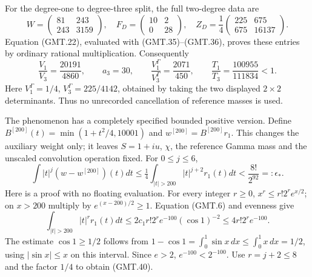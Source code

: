 For the degree-one to degree-three split, the full two-degree data are
\[
 W=\begin{pmatrix}81&243\\243&3159\end{pmatrix},\quad
 F_D=\begin{pmatrix}10&2\\0&28\end{pmatrix},\quad
 Z_D=\frac14\begin{pmatrix}225&675\\675&16137\end{pmatrix}.
                                                                    \tag{GMT.38}
\]
Equation (GMT.22), evaluated with (GMT.35)--(GMT.36), proves these
entries by ordinary rational multiplication. Consequently
\[
 \frac{V_1}{V_3}=\frac{20191}{4860},\qquad a_3=30,
 \qquad\frac{V_1^\Gamma}{V_3^\Gamma}=\frac{2071}{450},\qquad
 \boxed{\frac{T_1}{T_3}=\frac{100955}{111834}<1.}               \tag{GMT.39}
\]
Here $V_1^\Gamma=1/4$, $V_3^\Gamma=225/4142$, obtained by
taking the two displayed $2\times2$ determinants. Thus no
unrecorded cancellation of reference masses is used.

The phenomenon has a completely specified bounded positive version.
Define $B^{[200]}(t)=\min(1+t^2/4,10001)$ and
$w^{[200]}=B^{[200]}r_1$. This changes the auxiliary weight only;
it leaves $S=1+iu$, $\chi$, the reference Gamma mass and the
unscaled convolution operation fixed. For $0\le j\le6$,
\[
 \int |t|^j(w-w^{[200]})(t)dt
 \le\tfrac14\int_{|t|>200}|t|^{j+2}r_1(t)dt
 <\frac{8!}{2^{92}}=:\epsilon_*.                              \tag{GMT.40}
\]
Here is a proof with no floating evaluation. For every integer $r\ge0$,
$x^r\le r!2^r e^{x/2}$; on $x>200$ multiply by
$e^{(x-200)/2}\ge1$. Equation (GMT.6) and evenness give
\[
 \int_{|t|>200}|t|^r r_1(t)dt
 \le 2c_1 r!2^r e^{-100}(\cos1)^{-2}
 \le4r!2^r e^{-100}.
\]
The estimate $\cos1\ge1/2$ follows from
$1-\cos1=\int_0^1\sin x\,dx\le\int_0^1x\,dx=1/2$,
using $|\sin x|\le x$ on this interval.
Since $e>2$, $e^{-100}<2^{-100}$. Use $r=j+2\le8$ and the
factor $1/4$ to obtain (GMT.40).

